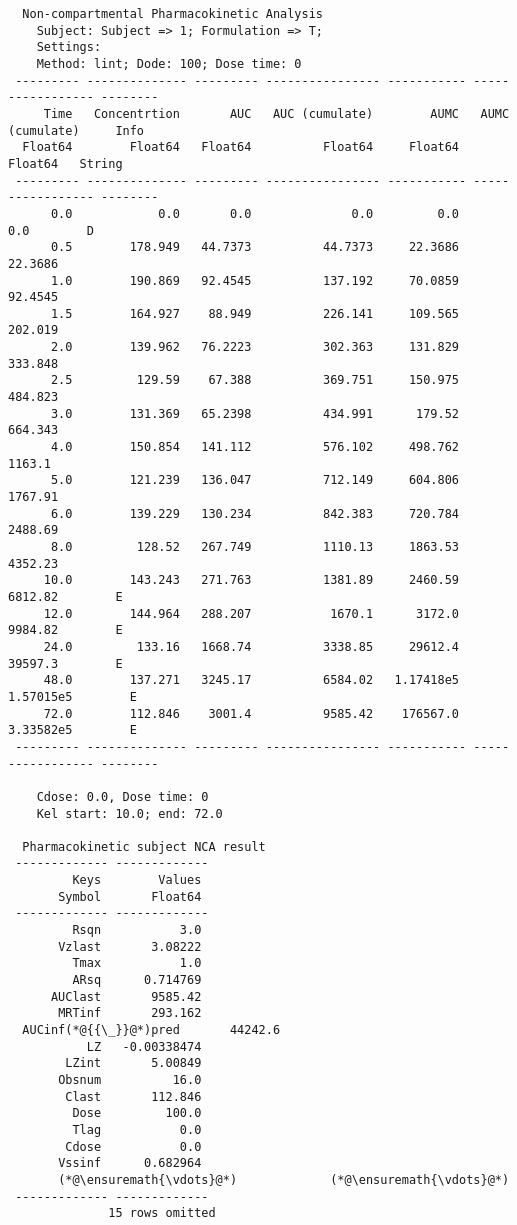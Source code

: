 \documentclass[12pt,a4paper]{article}
\begin{document}
\begin{lstlisting}
  Non-compartmental Pharmacokinetic Analysis
    Subject: Subject => 1; Formulation => T; 
    Settings:
    Method: lint; Dode: 100; Dose time: 0
 --------- -------------- --------- ---------------- ----------- ----------------- --------
     Time   Concentrtion       AUC   AUC (cumulate)        AUMC   AUMC (cumulate)     Info
  Float64        Float64   Float64          Float64     Float64           Float64   String
 --------- -------------- --------- ---------------- ----------- ----------------- --------
      0.0            0.0       0.0              0.0         0.0               0.0        D
      0.5        178.949   44.7373          44.7373     22.3686           22.3686
      1.0        190.869   92.4545          137.192     70.0859           92.4545
      1.5        164.927    88.949          226.141     109.565           202.019
      2.0        139.962   76.2223          302.363     131.829           333.848
      2.5         129.59    67.388          369.751     150.975           484.823
      3.0        131.369   65.2398          434.991      179.52           664.343
      4.0        150.854   141.112          576.102     498.762            1163.1
      5.0        121.239   136.047          712.149     604.806           1767.91
      6.0        139.229   130.234          842.383     720.784           2488.69
      8.0         128.52   267.749          1110.13     1863.53           4352.23
     10.0        143.243   271.763          1381.89     2460.59           6812.82        E
     12.0        144.964   288.207           1670.1      3172.0           9984.82        E
     24.0         133.16   1668.74          3338.85     29612.4           39597.3        E
     48.0        137.271   3245.17          6584.02   1.17418e5         1.57015e5        E
     72.0        112.846    3001.4          9585.42    176567.0         3.33582e5        E
 --------- -------------- --------- ---------------- ----------- ----------------- --------

    Cdose: 0.0, Dose time: 0
    Kel start: 10.0; end: 72.0

  Pharmacokinetic subject NCA result
 ------------- -------------
         Keys        Values
       Symbol       Float64
 ------------- -------------
         Rsqn           3.0
       Vzlast       3.08222
         Tmax           1.0
         ARsq      0.714769
      AUClast       9585.42
       MRTinf       293.162
  AUCinf(*@{{\_}}@*)pred       44242.6
           LZ   -0.00338474
        LZint       5.00849
       Obsnum          16.0
        Clast       112.846
         Dose         100.0
         Tlag           0.0
        Cdose           0.0
       Vssinf      0.682964
       (*@\ensuremath{\vdots}@*)             (*@\ensuremath{\vdots}@*)
 ------------- -------------
              15 rows omitted
\end{lstlisting}
\end{document}
